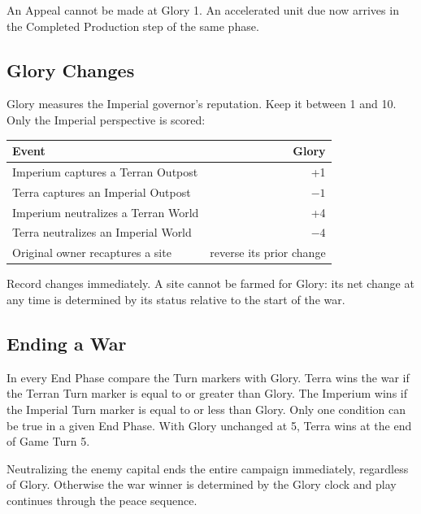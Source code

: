 An Appeal cannot be made at Glory 1. An accelerated unit due now arrives in
the Completed Production step of the same phase.

\subsection{Glory Changes}

Glory measures the Imperial governor's reputation. Keep it between 1 and 10.
Only the Imperial perspective is scored:

\begin{tabularx}{\columnwidth}{@{}Xr@{}}
\toprule
Event & Glory \\
\midrule
Imperium captures a Terran Outpost & +1 \\
Terra captures an Imperial Outpost & $-1$ \\
Imperium neutralizes a Terran World & +4 \\
Terra neutralizes an Imperial World & $-4$ \\
Original owner recaptures a site & reverse its prior change \\
\bottomrule
\end{tabularx}

Record changes immediately. A site cannot be farmed for Glory: its net change
at any time is determined by its status relative to the start of the war.

\subsection{Ending a War}

In every End Phase compare the Turn markers with Glory. Terra wins the war if
the Terran Turn marker is equal to or greater than Glory. The Imperium wins if
the Imperial Turn marker is equal to or less than Glory. Only one condition can
be true in a given End Phase. With Glory unchanged at 5, Terra wins at the end
of Game Turn 5.

Neutralizing the enemy capital ends the entire campaign immediately, regardless
of Glory. Otherwise the war winner is determined by the Glory clock and play
continues through the peace sequence.
